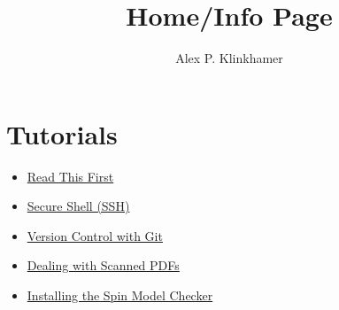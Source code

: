 
\title{Home/Info Page}
\author{Alex P. Klinkhamer}
\date{}



\section{Tutorials}
\begin{itemize}
\item \href{tut/prelim.html}{Read This First}
\item \href{tut/ssh.html}{Secure Shell (SSH)}
\item \href{tut/git.html}{Version Control with Git}
\item \href{tut/pdfscan.html}{Dealing with Scanned PDFs}
\item \href{tut/spin.html}{Installing the Spin Model Checker}
\end{itemize}



